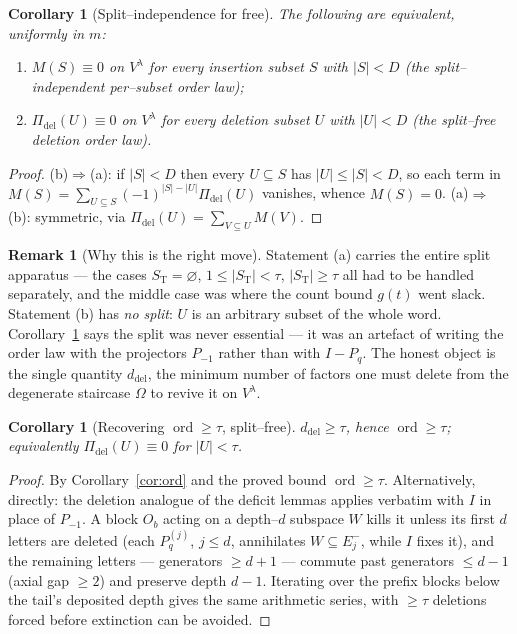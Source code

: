 \documentclass[11pt]{article}
\newtheorem{corollary}[theorem]{Corollary}
\theoremstyle{definition}
\newtheorem{remark}[theorem]{Remark}
\DeclareMathOperator{\ord}{ord}
\newcommand{\Vlam}{V^\lambda}
\newcommand{\Em}[1]{E^{-}_{#1}}
\newcommand{\Pq}{P_{q}}
\newcommand{\Pm}{P_{-1}}
\newcommand{\Pdel}{\Pi_{\mathrm{del}}}
\newcommand{\St}{S_{\mathrm T}}
\newcommand{\ddel}{d_{\mathrm{del}}}
\begin{document}
\begin{corollary}[Split--independence for free]\label{cor:split}
The following are equivalent, uniformly in $m$:
\begin{enumerate}[topsep=0.2em,itemsep=0.1em,label=\textup{(\alph*)}]
\item $M(S)\equiv0$ on $\Vlam$ for every insertion subset $S$ with $|S|<D$ \textup{(the
split--independent per--subset order law)};
\item $\Pdel(U)\equiv0$ on $\Vlam$ for every deletion subset $U$ with $|U|<D$ \textup{(the
split--free deletion order law)}.
\end{enumerate}
\end{corollary}

\begin{proof}
(b)$\Rightarrow$(a): if $|S|<D$ then every $U\subseteq S$ has $|U|\le|S|<D$, so each term in
$M(S)=\sum_{U\subseteq S}(-1)^{|S|-|U|}\Pdel(U)$ vanishes, whence $M(S)=0$. (a)$\Rightarrow$(b):
symmetric, via $\Pdel(U)=\sum_{V\subseteq U}M(V)$.
\end{proof}

\begin{remark}[Why this is the right move]
Statement (a) carries the entire split apparatus --- the cases $\St=\varnothing$, $1\le|\St|<
\tau$, $|\St|\ge\tau$ all had to be handled separately, and the middle case was where the
count bound $g(t)$ went slack. Statement (b) has \emph{no split}: $U$ is an arbitrary subset of
the whole word. Corollary~\ref{cor:split} says the split was never essential --- it was an
artefact of writing the order law with the projectors $\Pm$ rather than with $I-\Pq$. The
honest object is the single quantity $\ddel$, the minimum number of factors one must delete from
the degenerate staircase $\Omega$ to revive it on $\Vlam$.
\end{remark}

\begin{corollary}[Recovering $\ord\ge\tau$, split--free]\label{cor:tau}
$\ddel\ge\tau$, hence $\ord\ge\tau$; equivalently $\Pdel(U)\equiv0$ for $|U|<\tau$.
\end{corollary}

\begin{proof}
By Corollary~\ref{cor:ord} and the proved bound $\ord\ge\tau$. Alternatively, directly: the
deletion analogue of the deficit lemmas applies verbatim with $I$ in place of $\Pm$. A block
$O_b$ acting on a depth--$d$ subspace $W$ kills it unless its first $d$ letters are deleted
(each $\Pq^{(j)}$, $j\le d$, annihilates $W\subseteq\Em j$, while $I$ fixes it), and the
remaining letters --- generators $\ge d+1$ --- commute past generators $\le d-1$ (axial gap
$\ge2$) and preserve depth $d-1$. Iterating over the prefix blocks below the tail's deposited
depth gives the same arithmetic series, with $\ge\tau$ deletions forced before extinction can be
avoided. \end{proof}
\end{document}
